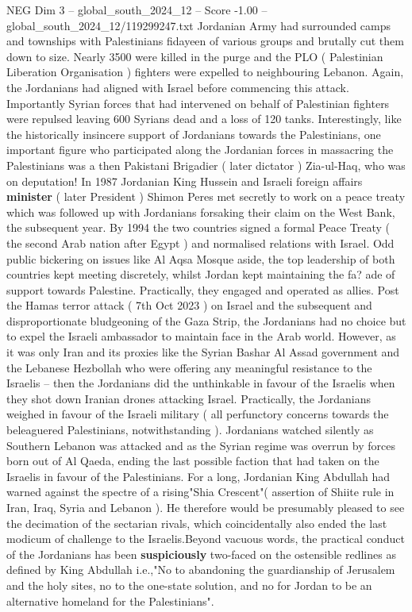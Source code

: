 \begin{textsample}{NEG Dim 3 – global\_south\_2024\_12 – Score -1.00 – global\_south\_2024\_12/119299247.txt}
Jordanian Army had surrounded camps and townships with Palestinians fidayeen of various groups and brutally cut them down to size.
Nearly 3500 were killed in the purge and the PLO ( Palestinian Liberation Organisation ) fighters were expelled to neighbouring Lebanon.
Again, the Jordanians had aligned with Israel before commencing this attack.
Importantly Syrian forces that had intervened on behalf of Palestinian fighters were repulsed leaving 600 Syrians dead and a loss of 120 tanks.
Interestingly, like the historically insincere support of Jordanians towards the Palestinians, one important figure who participated along the Jordanian forces in massacring the Palestinians was a then Pakistani Brigadier ( later dictator ) Zia-ul-Haq, who was on deputation!
In 1987 Jordanian King Hussein and Israeli foreign affairs \textbf{minister} ( later President ) Shimon Peres met secretly to work on a peace treaty which was followed up with Jordanians forsaking their claim on the West Bank, the subsequent year.
By 1994 the two countries signed a formal Peace Treaty ( the second Arab nation after Egypt ) and normalised relations with Israel.
Odd public bickering on issues like Al Aqsa Mosque aside, the top leadership of both countries kept meeting discretely, whilst Jordan kept maintaining the fa? ade of support towards Palestine.
Practically, they engaged and operated as allies.
Post the Hamas terror attack ( 7th Oct 2023 ) on Israel and the subsequent and disproportionate bludgeoning of the Gaza Strip, the Jordanians had no choice but to expel the Israeli ambassador to maintain face in the Arab world.
However, as it was only Iran and its proxies like the Syrian Bashar Al Assad government and the Lebanese Hezbollah who were offering any meaningful resistance to the Israelis -- then the Jordanians did the unthinkable in favour of the Israelis when they shot down Iranian drones attacking Israel.
Practically, the Jordanians weighed in favour of the Israeli military ( all perfunctory concerns towards the beleaguered Palestinians, notwithstanding ).
Jordanians watched silently as Southern Lebanon was attacked and as the Syrian regime was overrun by forces born out of Al Qaeda, ending the last possible faction that had taken on the Israelis in favour of the Palestinians.
For a long, Jordanian King Abdullah had warned against the spectre of a rising"Shia Crescent"( assertion of Shiite rule in Iran, Iraq, Syria and Lebanon ).
He therefore would be presumably pleased to see the decimation of the sectarian rivals, which coincidentally also ended the last modicum of challenge to the Israelis.Beyond vacuous words, the practical conduct of the Jordanians has been \textbf{suspiciously} two-faced on the ostensible redlines as defined by King Abdullah i.e.,"No to abandoning the guardianship of Jerusalem and the holy sites, no to the one-state solution, and no for Jordan to be an alternative homeland for the Palestinians".

\end{textsample}
